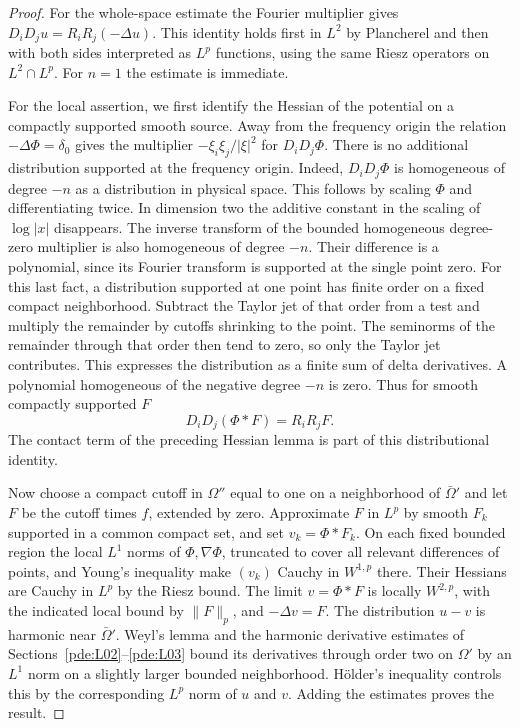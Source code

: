 \documentclass[11pt,oneside,openany]{book}
\theoremstyle{plain}
\theoremstyle{definition}
\theoremstyle{remark}
\begin{document}
\begin{proof}
For the whole-space estimate the Fourier multiplier gives
\(D_iD_j u=R_iR_j(-\Delta u)\). This identity holds first in
\(L^2\) by Plancherel and then with both sides interpreted as
\(L^p\) functions, using the same Riesz operators on \(L^2\cap L^p\).
For \(n=1\) the estimate is immediate.

For the local assertion, we first identify the Hessian of the
potential on a compactly supported smooth source. Away from the
frequency origin the relation \(-\Delta\Phi=\delta_0\) gives
the multiplier \(-\xi_i\xi_j/|\xi|^2\) for \(D_iD_j\Phi\).
There is no additional distribution supported at the frequency
origin. Indeed, \(D_iD_j\Phi\) is homogeneous of degree \(-n\)
as a distribution in physical space. This follows by scaling
\(\Phi\) and differentiating twice. In dimension two the
additive constant in the scaling of \(\log|x|\) disappears.
The inverse transform of the bounded homogeneous degree-zero
multiplier is also homogeneous of degree \(-n\).
Their difference is a polynomial, since its Fourier transform
is supported at the single point zero. For this last fact, a
distribution supported at one point has finite order on a fixed
compact neighborhood. Subtract the Taylor jet of that order
from a test and multiply the remainder by cutoffs shrinking
to the point. The seminorms of the remainder through that order
then tend to zero, so only the Taylor jet contributes. This
expresses the distribution as a finite sum of delta derivatives.
A polynomial homogeneous of the negative degree \(-n\) is zero.
Thus for smooth compactly supported \(F\)
\[
 D_iD_j(\Phi*F)=R_iR_jF .
\]
The contact term of the preceding Hessian lemma is part of this
distributional identity.

Now choose a compact cutoff in \(\Omega''\) equal to one on a
neighborhood of \(\bar\Omega'\) and let \(F\) be the cutoff times
\(f\), extended by zero. Approximate \(F\) in \(L^p\) by smooth
\(F_k\) supported in a common compact set, and set \(v_k=\Phi*F_k\).
On each fixed bounded region the local \(L^1\) norms of
\(\Phi,\nabla\Phi\), truncated to cover all relevant differences
of points, and Young's inequality make \((v_k)\) Cauchy in
\(W^{1,p}\) there. Their Hessians are Cauchy in \(L^p\) by the
Riesz bound. The limit \(v=\Phi*F\) is locally \(W^{2,p}\),
with the indicated local bound by \(\|F\|_p\), and
\(-\Delta v=F\). The distribution \(u-v\) is harmonic near
\(\bar\Omega'\). Weyl's lemma and the harmonic derivative
estimates of Sections~\ref{pde:L02}--\ref{pde:L03} bound its
derivatives through order two on \(\Omega'\) by an \(L^1\)
norm on a slightly larger bounded neighborhood. Hölder's
inequality controls this by the corresponding \(L^p\) norm of
\(u\) and \(v\). Adding the estimates proves the result.
\end{proof}
\end{document}
